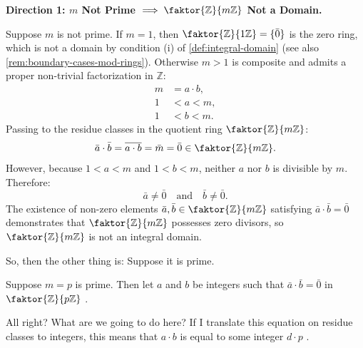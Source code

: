 \begin{proofWrapper}
\begin{content}
\textbf{Direction 1: \texorpdfstring{$m$}{m} Not Prime \texorpdfstring{$\implies \faktor{\mathbb{Z}}{m\mathbb{Z}}$}{=> Z/mZ} Not a Domain.}

Suppose $m$ is not prime. If $m = 1$, then $\faktor{\mathbb{Z}}{1\mathbb{Z}} = \{\bar{0}\}$ is the zero ring, which is not a domain by condition (i) of \cref{def:integral-domain} (see also \cref{rem:boundary-cases-mod-rings}). Otherwise $m > 1$ is composite and admits a proper non-trivial factorization in $\mathbb{Z}$:
\begin{align}
    m &= a \cdot b, \label{eq:composite-m-factor} \\
    1 &< a < m, \nonumber \\
    1 &< b < m. \nonumber
\end{align}
Passing to the residue classes in the quotient ring $\faktor{\mathbb{Z}}{m\mathbb{Z}}$:
\begin{equation}\label{eq:prod-zero-divisors}
\bar{a} \cdot \bar{b} = \overline{a \cdot b} = \bar{m} = \bar{0} \in \faktor{\mathbb{Z}}{m\mathbb{Z}}.
\end{equation}
However, because $1 < a < m$ and $1 < b < m$, neither $a$ nor $b$ is divisible by $m$. Therefore:
\begin{equation}\label{eq:nonzero-factors}
\bar{a} \neq \bar{0} \quad \text{and} \quad \bar{b} \neq \bar{0}.
\end{equation}
The existence of non-zero elements $\bar{a}, \bar{b} \in \faktor{\mathbb{Z}}{m\mathbb{Z}}$ satisfying $\bar{a} \cdot \bar{b} = \bar{0}$ demonstrates that $\faktor{\mathbb{Z}}{m\mathbb{Z}}$ possesses zero divisors, so $\faktor{\mathbb{Z}}{m\mathbb{Z}}$ is not an integral domain.
\end{content}

\begin{speech}[00:19:24 - 00:21:50]
So, then the other thing is: Suppose it is prime.

Suppose $m = p$ is prime.  Then let $a$ and $b$ be integers  such that $\bar{a} \cdot \bar{b} = \bar{0}$ in $\faktor{\mathbb{Z}}{p\mathbb{Z}}$ .

All right? What are we going to do here? If I translate this equation on residue classes to integers, this means that $a \cdot b$ is equal to some integer $d \cdot p$ .


\end{speech}
\end{proofWrapper}
